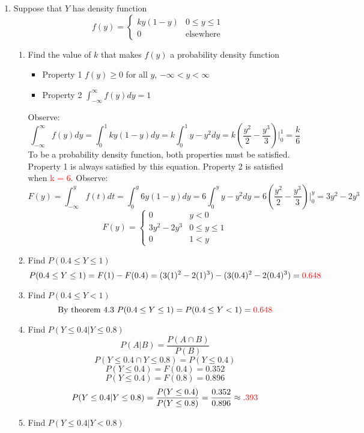 \documentclass{article}
\newcommand{\intersect}{\cap}
\begin{document}
\begin{enumerate}
\begin{enumerate}
    \end{enumerate}
\pagebreak
    \item Suppose that $Y$ has density function
    \[
    f(y)=
    \begin{cases}
        ky(1-y) & 0 \leq y \leq 1 \\
        0 & \text{elsewhere}
    \end{cases}
    \]
    \begin{enumerate}
        \item Find the value of $k$ that makes $f(y)$ a probability density function
        \begin{itemize}
            \item[]Property 1 $f(y) \geq 0$ for all $y$, $-\infty < y < \infty$
            \item[]Property 2 $\int_{-\infty}^{\infty}f(y)dy=1$
        \end{itemize}
        Observe:
        \[
            \int_{-\infty}^{\infty}f(y)dy=\int_{0}^{1}ky(1-y)dy=k\int_{0}^{1}y-y^2dy=k(\frac{y^2}{2}-\frac{y^3}{3})\Big|_0^1=\frac{k}{6}
        \]
        To be a probability density function, both properties must be satisfied. Property 1 is always satisfied by this equation. Property 2 is satisfied when \textcolor{red}{k = 6}.
        Observe: 
        \[
            F(y)=\int_{-\infty}^{y}f(t)dt=\int_{0}^{y}6y(1-y)dy=6\int_{0}^{y}y-y^2dy=6(\frac{y^2}{2}-\frac{y^3}{3})\Big|_0^y=3y^2-2y^3
        \]
        \[
        F(y)=
        \begin{cases}
            0 & y < 0 \\
            3y^2-2y^3 & 0 \leq y \leq 1 \\
            0 & 1 < y
        \end{cases}
        \]
        \item Find $P(0.4 \leq Y \leq 1)$
        \[
            P(0.4 \leq Y \leq 1)=F(1)-F(0.4)=(3(1)^2-2(1)^3)-(3(0.4)^2-2(0.4)^3)=\textcolor{red}{0.648}
        \]
        \item Find $P(0.4 \leq Y < 1)$
        \[\text{By theorem 4.3 } P(0.4 \leq Y \leq 1)=P(0.4 \leq Y < 1)=\textcolor{red}{0.648}\]
        \item Find $P(Y \leq 0.4|Y \leq 0.8)$
        \[P(A|B)=\frac{P(A \intersect B)}{P(B)}\]
        \[P(Y \leq 0.4 \intersect Y \leq 0.8)= P(Y \leq 0.4)\]
        \[P(Y \leq 0.4) = F(0.4)=0.352\]
        \[P(Y \leq 0.4) = F(0.8)=0.896\]
        \[P(Y \leq 0.4|Y \leq 0.8)=\frac{P(Y \leq 0.4)}{P(Y \leq 0.8)}=\frac{0.352}{0.896}\approx\textcolor{red}{.393}\]
        \item Find $P(Y \leq 0.4|Y < 0.8)$

\end{enumerate}
\end{enumerate}
\end{document}
